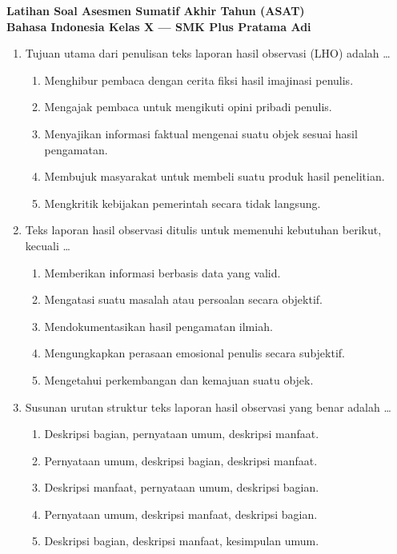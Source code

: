 \documentclass[12pt,a4paper]{article}
\begin{document}
\begin{center}
    \textbf{\Large Latihan Soal Asesmen Sumatif Akhir Tahun (ASAT)} \\
    \textbf{Bahasa Indonesia Kelas X --- SMK Plus Pratama Adi}
\end{center}
\vspace{0.5cm}

\begin{enumerate}[leftmargin=*]


\item Tujuan utama dari penulisan teks laporan hasil observasi (LHO) adalah \dots
    \begin{enumerate}[label=\alph*.]
        \item Menghibur pembaca dengan cerita fiksi hasil imajinasi penulis.
        \item Mengajak pembaca untuk mengikuti opini pribadi penulis.
        \item Menyajikan informasi faktual mengenai suatu objek sesuai hasil pengamatan.
        \item Membujuk masyarakat untuk membeli suatu produk hasil penelitian.
        \item Mengkritik kebijakan pemerintah secara tidak langsung.
    \end{enumerate}

\item Teks laporan hasil observasi ditulis untuk memenuhi kebutuhan berikut, kecuali \dots
    \begin{enumerate}[label=\alph*.]
        \item Memberikan informasi berbasis data yang valid.
        \item Mengatasi suatu masalah atau persoalan secara objektif.
        \item Mendokumentasikan hasil pengamatan ilmiah.
        \item Mengungkapkan perasaan emosional penulis secara subjektif.
        \item Mengetahui perkembangan dan kemajuan suatu objek.
    \end{enumerate}

\item Susunan urutan struktur teks laporan hasil observasi yang benar adalah \dots
    \begin{enumerate}[label=\alph*.]
        \item Deskripsi bagian, pernyataan umum, deskripsi manfaat.
        \item Pernyataan umum, deskripsi bagian, deskripsi manfaat.
        \item Deskripsi manfaat, pernyataan umum, deskripsi bagian.
        \item Pernyataan umum, deskripsi manfaat, deskripsi bagian.
        \item Deskripsi bagian, deskripsi manfaat, kesimpulan umum.
    \end{enumerate}


\end{enumerate}
\end{document}
